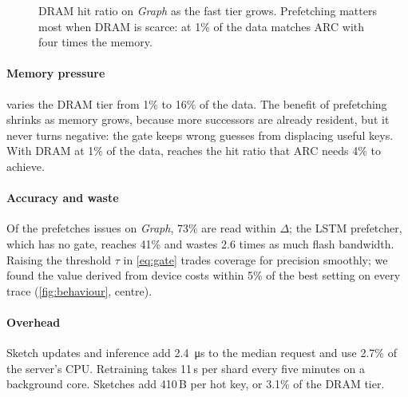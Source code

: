 \documentclass[10pt, twocolumn]{article}
\begin{document}
\begin{figure}[t]
  \centering
  \caption{DRAM hit ratio on \emph{Graph} as the fast tier grows. Prefetching
  matters most when DRAM is scarce: at 1\% of the data \sys{}
  matches ARC with four times the memory.}
  \label{fig:capacity}
\end{figure}

\paragraph{Memory pressure}
 varies the DRAM tier from 1\% to 16\% of the data. The
benefit of prefetching shrinks as memory grows, because more successors are
already resident, but it never turns negative: the gate keeps wrong guesses
from displacing useful keys. With DRAM at 1\% of the data,
\sys{} reaches the hit ratio that ARC needs 4\% to achieve.

\paragraph{Accuracy and waste}
Of the prefetches \sys{} issues on \emph{Graph}, 73\% are read
within $\Delta$; the LSTM prefetcher, which has no gate, reaches 41\% and
wastes 2.6 times as much flash bandwidth. Raising the threshold $\tau$ in
\eqref{eq:gate} trades coverage for precision smoothly; we found the value
derived from device costs within 5\% of the best setting on every trace
(\cref{fig:behaviour}, centre).

\paragraph{Overhead}
Sketch updates and inference add \SI{2.4}{\micro\second} to the median
request and use 2.7\% of the server's CPU. Retraining takes 11\,s per
shard every five minutes on a background core. Sketches add 410\,B per hot
key, or 3.1\% of the DRAM tier.
\end{document}
